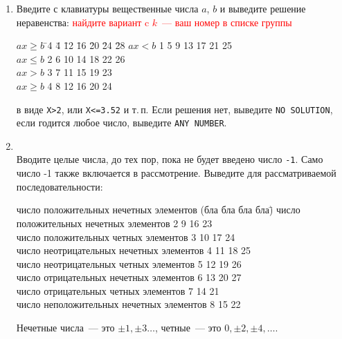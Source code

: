 \documentclass{article}
\begin{document}
\begin{enumerate}

\item
Введите с клавиатуры вещественные числа $a$, $b$ и выведите решение неравенства:
\hfill\textcolor{red}{найдите вариант c $k$~--- ваш номер в списке группы}
\newcommand{\grtb}{\>\color{red}}
\begin{tabbing}
$ax\geqslant b$ \hspace{18mm} \= \color{red}4 \=4 \=12 \=16 \=20 \=24 \=28\kill
$ax<b$  \> \color{red}1 \grtb 5 \grtb 9 \grtb  13 \grtb 17 \grtb 21 \grtb 25 
\\$ax\leqslant b$  \grtb  2 \grtb 6 \grtb 10 \grtb 14 \grtb 18 \grtb 22 \grtb 26
\\$ax>b$  \grtb  3 \grtb 7 \grtb 11 \grtb 15 \grtb 19 \grtb 23 
\\$ax\geqslant b$  \grtb  4 \grtb 8 \grtb 12 \grtb 16 \grtb 20 \grtb 24     
\end{tabbing}
в виде \texttt{X>2}, или  \texttt{X<=3.52} и т.\,п. Если решения нет, выведите \texttt{NO SOLUTION}, если годится любое число, выведите \texttt{ANY NUMBER}.

\item
{}\\
Вводите целые числа, до тех пор, пока не будет введено число \texttt{-1}. Само число -1 также включается в рассмотрение. Выведите для рассматриваемой последовательности:
\begin{tabbing}
число положительных нечетных элементов (бла бла бла бла)\=\kill
число положительных нечетных элементов      \>\color{red}2 9  16 23\\
число положительных четных элементов        \>\color{red}3 10 17 24\\
число неотрицательных нечетных элементов    \>\color{red}4 11 18 25\\
число неотрицательных четных элементов      \>\color{red}5 12 19 26\\
число отрицательных нечетных элементов      \>\color{red}6 13 20 27\\
число отрицательных четных элементов        \>\color{red}7 14 21\\
число неположительных нечетных элементов    \>\color{red}8 15 22
\end{tabbing}
Нечетные числа~--- это $\pm 1, \pm 3\ldots$, четные~---  это $0, \pm 2, \pm 4,\ldots$.


\end{enumerate}
\end{document}
